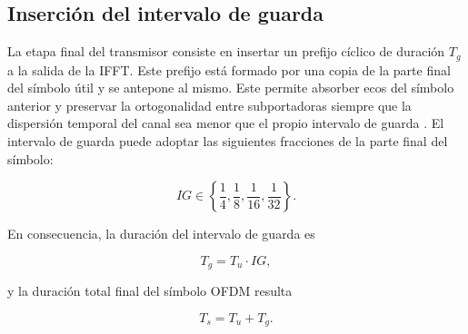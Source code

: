 \subsection{Inserción del intervalo de guarda}

La etapa final del transmisor consiste en insertar un prefijo cíclico de duración $T_g$ a la salida de la IFFT. Este prefijo está formado por una copia de la parte final del símbolo útil y se antepone al mismo. Este permite absorber ecos del símbolo anterior y preservar la ortogonalidad entre subportadoras siempre que la dispersión temporal del canal sea menor que el propio intervalo de guarda \cite{portugues}. El intervalo de guarda puede adoptar las siguientes fracciones de la parte final del símbolo:

\begin{equation}
IG \in \left\{\frac14,\frac18,\frac1{16},\frac1{32}\right\}.
\end{equation}

En consecuencia, la duración del intervalo de guarda es

\begin{equation}
T_g = T_u \cdot IG,
\end{equation}

y la duración total final del símbolo OFDM resulta

\begin{equation}
T_s = T_u + T_g.
\end{equation}



